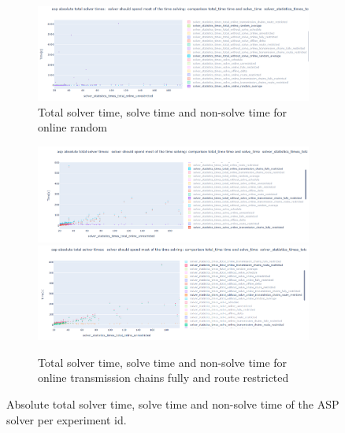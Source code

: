 \documentclass{article}
\begin{document}
\begin{figure}
  \ContinuedFloat
    \begin{subfigure}{\textwidth}
        \includegraphics[width=\textwidth]{Figures/04_computational_results/solve_non_solve_online_random.PNG}
        \caption{Total solver time, solve time and non-solve time for online random}
         \label{fig:computationtimes_solve_non_solve_time_online_random}
    \end{subfigure}
    \begin{subfigure}{\textwidth}
        \includegraphics[width=\textwidth]{Figures/04_computational_results/solve_non_solve_online_transmission_chains_fully_restricted.PNG}
                \includegraphics[width=\textwidth]{Figures/04_computational_results/solve_non_solve_online_transmission_chains_route_restricted.PNG}
        \caption{Total solver time, solve time and non-solve time for online transmission chains fully and route restricted}
        \label{fig:computationtimes_solve_non_solve_time_online_tranmission_chains}
    \end{subfigure}
	\caption{Absolute total solver time, solve time and non-solve time of the ASP solver per experiment id.}
	\label{fig:solve_non_solve}
\end{figure}
\end{document}
